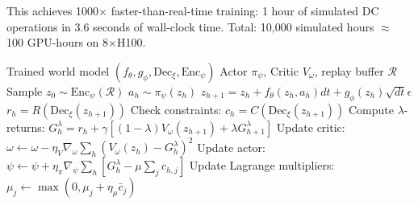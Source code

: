 \documentclass[conference,10pt]{IEEEtran}
\begin{document}
This achieves 1000$\times$ faster-than-real-time training: 1 hour of simulated DC operations in 3.6 seconds of wall-clock time. Total: 10,000 simulated hours $\approx$ 100 GPU-hours on 8$\times$H100.

\begin{table}[!htbp]
\caption{DreamerV3-Infra vs.\ Direct RL Baselines}
\label{tab:dreamer}
\centering\scriptsize
{}
\end{table}


\begin{algorithm}[!t]
\caption{DreamerV3-Infra: Imagination-Based Training}
\label{alg:dreamer}
\begin{algorithmic}[1]
\Require Trained world model $(f_\theta, g_\phi, \text{Dec}_\xi, \text{Enc}_\psi)$
\Require Actor $\pi_\psi$, Critic $V_\omega$, replay buffer $\mathcal{R}$
    \State Sample $z_0 \sim \text{Enc}_\psi(\mathcal{R})$ 
     
        \State $a_h \sim \pi_\psi(z_h)$
        \State $z_{h+1} = z_h + f_\theta(z_h, a_h) dt + g_\phi(z_h) \sqrt{dt} \epsilon$
        \State $r_h = R(\text{Dec}_\xi(z_{h+1}))$
        \State Check constraints: $c_h = C(\text{Dec}_\xi(z_{h+1}))$
    \EndFor
    \State Compute $\lambda$-returns: $G_h^\lambda = r_h + \gamma[(1{-}\lambda)V_\omega(z_{h+1}) + \lambda G_{h+1}^\lambda]$
    \State Update critic: $\omega \leftarrow \omega - \eta_V \nabla_\omega \sum_h (V_\omega(z_h) - G_h^\lambda)^2$
    \State Update actor: $\psi \leftarrow \psi + \eta_\pi \nabla_\psi \sum_h [G_h^\lambda - \mu \sum_j c_{h,j}]$
    \State Update Lagrange multipliers: $\mu_j \leftarrow \max(0, \mu_j + \eta_\mu \bar{c}_j)$
\EndFor
\end{algorithmic}
\end{algorithm}
\end{document}
